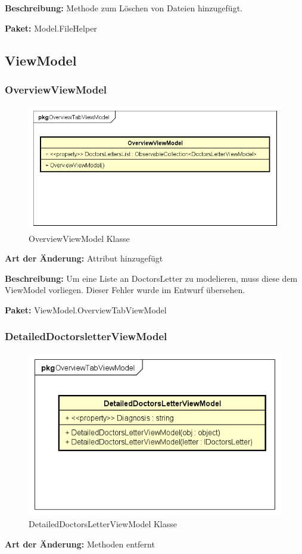 \documentclass[a4paper]{scrreprt}
\begin{document}
\textbf{Beschreibung:} Methode zum Löschen von Dateien hinzugefügt.

\textbf{Paket:} Model.FileHelper

\subsection{ViewModel}
\subsubsection{OverviewViewModel}
\begin{figure}[H]
\centering
\includegraphics[width=0.45\textheight]{graphics/Klassendiagramme/ViewModel/OverviewViewModel}
\caption{OverviewViewModel Klasse}
\end{figure}
\textbf{Art der Änderung:} Attribut hinzugefügt

\textbf{Beschreibung:} Um eine Liste an DoctorsLetter zu modelieren, muss diese dem ViewModel vorliegen. Dieser Fehler wurde im Entwurf übersehen. 

\textbf{Paket:} ViewModel.OverviewTabViewModel



\subsubsection{DetailedDoctorsletterViewModel}
\begin{figure}[H]
\centering
\includegraphics[width=0.45\textheight]{graphics/Klassendiagramme/ViewModel/DetailedDoctorsletterViewModel}
\caption{DetailedDoctorsLetterViewModel Klasse}
\end{figure}
\textbf{Art der Änderung:} Methoden entfernt
\end{document}
